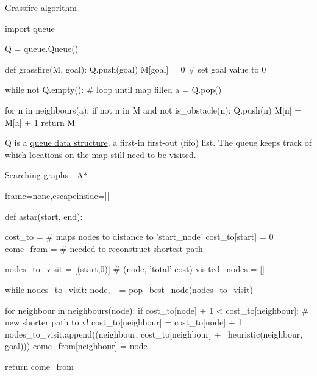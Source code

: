 \documentclass[compress]{beamer}
\begin{document}
\begin{frame}[fragile]{Grassfire algorithm}

\begin{pythoncode}
import queue

Q = queue.Queue()

def grassfire(M, goal):
    Q.push(goal)
    M[goal] = 0 # set goal value to 0

    while not Q.empty(): # loop until map filled
        a = Q.pop()

        for n in neighbours(a):
            if not n in M and not is_obstacle(n):
                Q.push(n)
                M[n] = M[a] + 1
    return M
\end{pythoncode}

Q is a \href{http://en.wikipedia.org/wiki/Queue_(abstract_data_type)}{queue
data structure}, a first-in first-out (fifo) list. The queue keeps track of
which locations on the map still need to be visited.

\end{frame}


\begin{frame}[fragile]{Searching graphs - A*}

\begin{pythoncode*}{frame=none,escapeinside=||}

def astar(start, end):

  cost_to = {} # maps nodes to distance to 'start_node'
  cost_to[start] = 0
  come_from = {} # needed to reconstruct shortest path

  nodes_to_visit = [(start,0)] # (node, 'total' cost)
  visited_nodes = []

  while nodes_to_visit:
    node,_ = pop_best_node(nodes_to_visit)

    for neighbour in neighbours(node):
      if cost_to[node] + 1  < cost_to[neighbour]: # new shorter path to v!
        cost_to[neighbour] = cost_to[node] + 1
        nodes_to_visit.append((neighbour, cost_to[neighbour] + \
                                  heuristic(neighbour, goal)))
        come_from[neighbour] = node

  return come_from
\end{pythoncode*}
\end{frame}

\begin{frame}{}
\end{frame}

\end{document}
